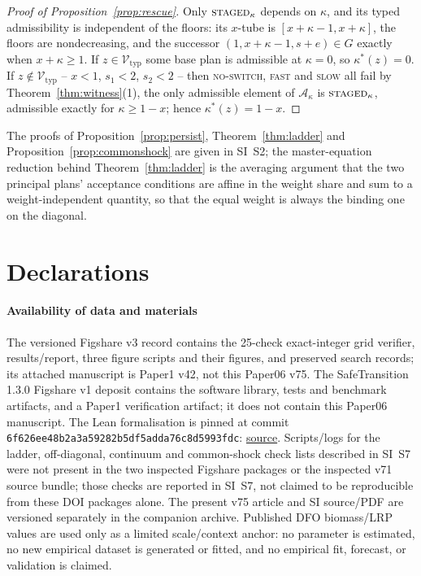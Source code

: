 \documentclass[preprint,11pt,authoryear]{elsarticle}
\theoremstyle{definition}
\theoremstyle{remark}
\newcommand{\Vtyp}{\mathcal{V}_{\mathrm{typ}}}
\newcommand{\act}[1]{\textsc{#1}}
\begin{document}
\begin{proof}[Proof of Proposition~\ref{prop:rescue}]
Only $\act{staged}_\kappa$ depends on $\kappa$, and its typed admissibility is independent of the floors: its $x$-tube is $[x+\kappa-1,x+\kappa]$, the floors are nondecreasing, and the successor $(1,x+\kappa-1,s+e)\in G$ exactly when $x+\kappa\ge1$. If $z\in\Vtyp$ some base plan is admissible at $\kappa=0$, so $\kappa^*(z)=0$. If $z\notin\Vtyp$ -- $x<1$, $s_1<2$, $s_2<2$ -- then \act{no-switch}, \act{fast} and \act{slow} all fail by Theorem~\ref{thm:witness}(1), the only admissible element of $\mathcal A_\kappa$ is $\act{staged}_\kappa$, admissible exactly for $\kappa\ge1-x$; hence $\kappa^*(z)=1-x$.
\end{proof}

\noindent The proofs of Proposition~\ref{prop:persist}, Theorem~\ref{thm:ladder} and Proposition~\ref{prop:commonshock} are given in SI~S2; the master-equation reduction behind Theorem~\ref{thm:ladder} is the averaging argument that the two principal plans' acceptance conditions are affine in the weight share and sum to a weight-independent quantity, so that the equal weight is always the binding one on the diagonal.

\section*{Declarations}
\paragraph{Availability of data and materials} The versioned Figshare v3 record \citep{Abaee2026code} contains the 25-check exact-integer grid verifier, results/report, three figure scripts and their figures, and preserved search records; its attached manuscript is Paper1 v42, not this Paper06 v75. The SafeTransition 1.3.0 Figshare v1 deposit \citep{Abaee2026software} contains the software library, tests and benchmark artifacts, and a Paper1 verification artifact; it does not contain this Paper06 manuscript. The Lean formalisation is pinned at commit \texttt{6f626ee48b2a3a59282b5df5adda76c8d5993fdc}: \href{https://github.com/MIKEAA2020/general-sustainability/blob/6f626ee48b2a3a59282b5df5adda76c8d5993fdc/lean/Formalizations/P1_AssessmentSeparation.lean}{source}. Scripts/logs for the ladder, off-diagonal, continuum and common-shock check lists described in SI~S7 were not present in the two inspected Figshare packages or the inspected v71 source bundle; those checks are reported in SI~S7, not claimed to be reproducible from these DOI packages alone. The present v75 article and SI source/PDF are versioned separately in the companion archive. Published DFO biomass/LRP values are used only as a limited scale/context anchor: no parameter is estimated, no new empirical dataset is generated or fitted, and no empirical fit, forecast, or validation is claimed.
\end{document}
